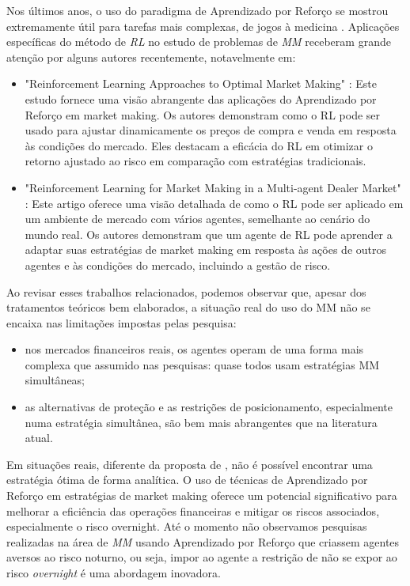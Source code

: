 Nos últimos anos, o uso do paradigma de Aprendizado por Reforço se mostrou extremamente útil para tarefas mais complexas, de jogos à medicina \citep{Kaelbling1996}. 
Aplicações específicas do método de \textit{RL} no estudo de problemas de \textit{MM} receberam grande atenção por alguns autores recentemente, notavelmente em:
\begin{itemize}
    \item "Reinforcement Learning Approaches to Optimal Market Making" \citep{Gasperov2021}: Este estudo fornece uma visão abrangente das aplicações do Aprendizado por Reforço em market making. Os autores demonstram como o RL pode ser usado para ajustar dinamicamente os preços de compra e venda em resposta às condições do mercado. Eles destacam a eficácia do RL em otimizar o retorno ajustado ao risco em comparação com estratégias tradicionais.
    \item "Reinforcement Learning for Market Making in a Multi-agent Dealer Market" \citep{Ganesh2019}: Este artigo oferece uma visão detalhada de como o RL pode ser aplicado em um ambiente de mercado com vários agentes, semelhante ao cenário do mundo real. Os autores demonstram que um agente de RL pode aprender a adaptar suas estratégias de market making em resposta às ações de outros agentes e às condições do mercado, incluindo a gestão de risco.
\end{itemize}

Ao revisar esses trabalhos relacionados, podemos observar que, apesar dos tratamentos teóricos bem elaborados, a situação real do uso do MM não se encaixa nas limitações impostas pelas pesquisa:

\begin{itemize}
    \item nos mercados financeiros reais, os agentes operam de uma forma mais complexa que assumido nas pesquisas: quase todos usam estratégias MM simultâneas;
    \item as alternativas de proteção e as restrições de posicionamento, especialmente numa estratégia simultânea, são bem mais abrangentes que na literatura atual. 
\end{itemize}

Em situações reais, diferente da proposta de \citet{Avellaneda2008}, não é possível encontrar uma estratégia ótima de forma analítica. O uso de técnicas de Aprendizado por Reforço em estratégias de market making oferece um potencial significativo para melhorar a eficiência das operações financeiras e mitigar os riscos associados, especialmente o risco overnight. Até o momento não observamos pesquisas realizadas na área de \textit{MM} usando Aprendizado por Reforço que criassem agentes aversos ao risco noturno, ou seja, impor ao agente a restrição de não se expor ao risco \textit{overnight} é uma abordagem inovadora.
